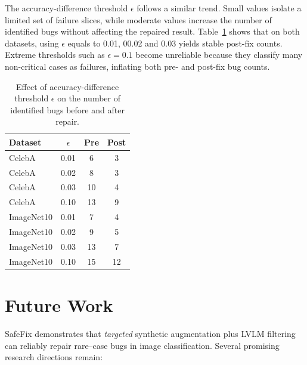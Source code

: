 \documentclass[10pt]{article} %
\newcommand{\model}{SafeFix\xspace}
\begin{document}
The accuracy-difference threshold $\epsilon$ follows a similar trend. Small values isolate a limited set of failure slices, while moderate values increase the number of identified bugs without affecting the repaired result. Table~\ref{tab:epsilon_threshold} shows that on both datasets, using \(\epsilon\) equals to 0.01, 00.02 and 0.03 yields stable post-fix counts. Extreme thresholds such as $\epsilon=0.1$ become unreliable because they classify many non-critical cases as failures, inflating both pre- and post-fix bug counts.

\begin{table}[!t]
\centering
\small
\setlength{\tabcolsep}{6pt}
\renewcommand{\arraystretch}{0.95}
\caption{Effect of accuracy-difference threshold $\epsilon$ on the number of identified bugs before and after repair.}
\label{tab:epsilon_threshold}
\begin{tabular}{lccc}
\toprule
\textbf{Dataset} & \boldmath$\epsilon$ & \textbf{Pre} & \textbf{Post} \\
\midrule
CelebA      & 0.01 & 6  & 3 \\
CelebA      & 0.02 & 8  & 3 \\
CelebA      & 0.03 & 10 & 4 \\
CelebA      & 0.10 & 13 & 9 \\
ImageNet10  & 0.01 & 7  & 4 \\
ImageNet10  & 0.02 & 9  & 5 \\
ImageNet10  & 0.03 & 13 & 7 \\
ImageNet10  & 0.10 & 15 & 12 \\
\bottomrule
\end{tabular}
\end{table}


\section{Future Work}
\label{sec:future_work}

\model{} demonstrates that \emph{targeted} synthetic augmentation plus LVLM
filtering can reliably repair rare–case bugs in image classification.  
Several promising research directions remain:
\end{document}
